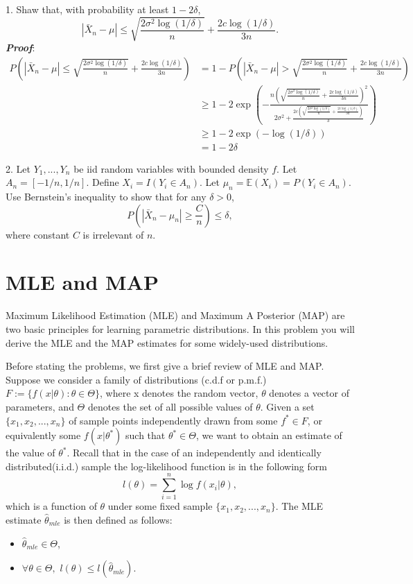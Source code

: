 \documentclass{article}
\theoremstyle{definition}
\theoremstyle{definition}
\theoremstyle{remark}
\begin{document}
1. Shaw that, with probability at least $1-2\delta$,
\[
|\bar{X}_n-\mu| \leq \sqrt{\frac{2\sigma^2\log(1/\delta)}{n}}+\frac{2c\log(1/\delta)}{3n}.
\]
\emph{\textbf{Proof}}:\\
\begin{equation}\nonumber
\begin{aligned}
P\left(|\bar{X}_n-\mu| \leq \sqrt{\frac{2\sigma^2\log(1/\delta)}{n}}+\frac{2c\log(1/\delta)}{3n}\right)&=1-P\left(|\bar{X}_n-\mu| >\sqrt{\frac{2\sigma^2\log(1/\delta)}{n}}+\frac{2c\log(1/\delta)}{3n}\right)\\
             &\geq 1- 2\exp\left(-\frac{n(\sqrt{\frac{2\sigma^2\log(1/\delta)}{n}}+\frac{2c\log(1/\delta)}{3n})^2}{2\sigma^2
             +\frac{2c(\sqrt{\frac{2\sigma^2\log(1/\delta)}{n}}+\frac{2c\log(1/\delta)}{3n})}{3}}\right)\\
            &\geq 1-2\exp\left(-\log(1/\delta)\right)\\
            &=1-2\delta
\end{aligned}
\end{equation}

2. Let $Y_1,...,Y_n$ be iid random variables with bounded density $f$. Let $A_n=[-1/n,1/n]$. Define $X_i=I(Y_i\in A_n)$. Let $\mu_n=\mathbb{E}(X_i)=P(Y_i\in A_n)$.
Use Bernstein's inequality to show that for any $\delta > 0$,
\[
P\left(|\bar{X}_n-\mu_n|\geq \frac{C}{n}\right)\leq \delta,
\]
where constant $C$ is irrelevant of $n$.

\section*{MLE and MAP}

Maximum Likelihood Estimation (MLE) and Maximum A Posterior (MAP) are two basic principles for
learning parametric distributions. In this problem you will derive the MLE and the MAP estimates for some
widely-used distributions.

Before stating the problems, we first give a brief review of MLE and MAP. Suppose we consider a family of
distributions (c.d.f or p.m.f.) $F:=\{f(x|\theta):\theta\in\Theta\}$, where x denotes the random vector, $\theta$
denotes a vector of parameters, and $\Theta$ denotes the set of all possible values of $\theta$. Given a set
$\{x_1,x_2,...,x_n\}$ of sample points independently drawn from some $f^*\in F$, or equivalently some $f(x|\theta^*)$
such that $\theta^*\in \Theta$, we want to obtain an estimate of the value of $\theta^*$. Recall that in the case
of an independently and identically distributed(i.i.d.) sample the log-likelihood function is in the following
form
\[
l(\theta)=\sum_{i=1}^n \log f(x_i|\theta),
\]
which is a function of $\theta$ under some fixed sample $\{x_1,x_2,...,x_n\}$. The MLE estimate $\hat{\theta}_{mle}$ is
then defined as follows:
\begin{itemize}
  \item $\hat{\theta}_{mle}\in\Theta$,
  \item $\forall \theta\in\Theta,$ $l(\theta)\leq l(\hat{\theta}_{mle})$.
\end{itemize}
\end{document}
